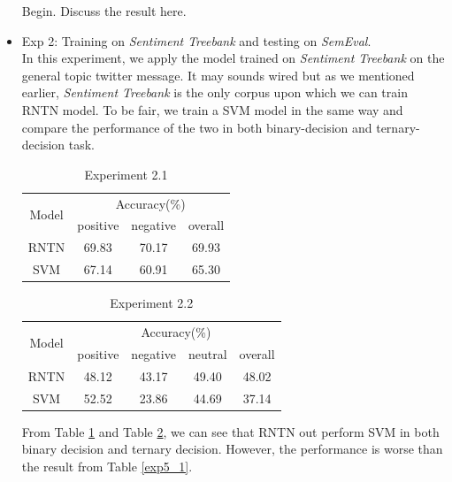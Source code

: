 \begin{itemize}
Begin. \vspace{5cm} Discuss the result here. 


\item Exp 2: Training on \textit{Sentiment Treebank} and testing on \textit{SemEval}. \\ 
In this experiment, we apply the model trained on \textit{Sentiment Treebank} on the general topic twitter message. It may sounds wired but as we mentioned earlier, \textit{Sentiment Treebank} is the only corpus upon which we can train RNTN model. To be fair, we train a SVM model in the same way and compare the performance of the two in both binary-decision and ternary-decision task. 
\begin{table}[H]
  \begin{center}
    \begin{tabular}{cccc}\hline
      \multirow{2}{*}{Model} 
      & \multicolumn{3}{c}{Accuracy(\%)} \\\cline{2-4}
    & positive & negative & overall \\ \hline
    RNTN  & 69.83     &   70.17	    &   69.93    \\ 
    SVM   & 67.14     &   60.91     &   65.30      \\ \hline
    \end{tabular}
    \end{center}
    \caption{\label{exp5_2_1} Experiment 2.1}
\end{table}

\begin{table}[H]
  \begin{center}
    \begin{tabular}{ccccc}\hline
      \multirow{2}{*}{Model} 
      & \multicolumn{4}{c}{Accuracy(\%)} \\\cline{2-5}
    & positive & negative & neutral & overall \\ \hline
    RNTN  & 48.12    &   43.17  	   &   49.40       & 48.02    \\ 
    SVM   & 52.52    &   23.86     &   44.69       & 37.14    \\ \hline
    \end{tabular}
    \end{center}
    \caption{\label{exp5_2_2} Experiment 2.2}
\end{table}

From Table \ref{exp5_2_1} and Table \ref{exp5_2_2}, we can see that RNTN out perform SVM in both binary decision and ternary decision. However, the performance is worse than the result from Table \ref{exp5_1}. 


\end{itemize}

